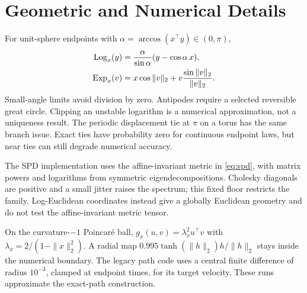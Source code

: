 \section{Geometric and Numerical Details}
\label{app:geometry}
For unit-sphere endpoints with $\alpha=\arccos(x^\top y)\in(0,\pi)$,
\begin{align}
\operatorname{Log}_x(y)&=\frac{\alpha}{\sin\alpha}(y-\cos\alpha\,x),\\
\operatorname{Exp}_x(v)&=x\cos\|v\|_2+v\frac{\sin\|v\|_2}{\|v\|_2}.
\end{align}
Small-angle limits avoid division by zero. Antipodes require a selected reversible great circle. Clipping an unstable logarithm is a numerical approximation, not a uniqueness result. The periodic displacement tie at $\pi$ on a torus has the same branch issue. Exact ties have probability zero for continuous endpoint laws, but near ties can still degrade numerical accuracy.

The SPD implementation uses the affine-invariant metric in \cref{eq:spd}, with matrix powers and logarithms from symmetric eigendecompositions. Cholesky diagonals are positive and a small jitter raises the spectrum; this fixed floor restricts the family. Log-Euclidean coordinates instead give a globally Euclidean geometry and do not test the affine-invariant metric tensor.

On the curvature-$-1$ Poincar\'e ball, $g_x(u,v)=\lambda_x^2u^\top v$ with $\lambda_x=2/(1-\|x\|_2^2)$. A radial map $0.995\tanh(\|h\|_2)h/\|h\|_2$ stays inside the numerical boundary. The legacy path code uses a central finite difference of radius $10^{-3}$, clamped at endpoint times, for its target velocity. These runs approximate the exact-path construction.


\clearpage
